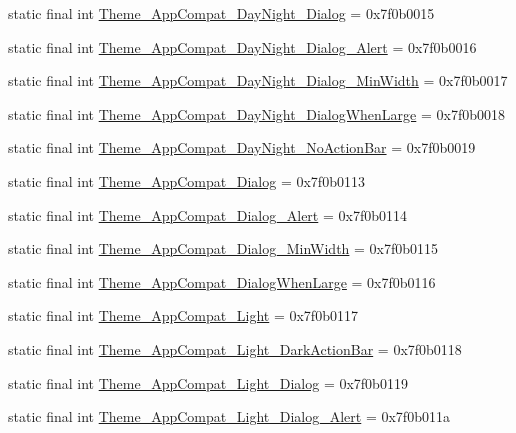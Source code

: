 \begin{CompactItemize}
static final int \hyperlink{classcom_1_1companyname_1_1x__2doo_1_1_r_1_1style_713eed972349f6073076f684ba449955}{Theme\_\-AppCompat\_\-DayNight\_\-Dialog} = 0x7f0b0015
\item 
static final int \hyperlink{classcom_1_1companyname_1_1x__2doo_1_1_r_1_1style_6a76905add50472c8b14fde676a2ddd1}{Theme\_\-AppCompat\_\-DayNight\_\-Dialog\_\-Alert} = 0x7f0b0016
\item 
static final int \hyperlink{classcom_1_1companyname_1_1x__2doo_1_1_r_1_1style_49f8b937351ad1ebd887897ba23925e2}{Theme\_\-AppCompat\_\-DayNight\_\-Dialog\_\-MinWidth} = 0x7f0b0017
\item 
static final int \hyperlink{classcom_1_1companyname_1_1x__2doo_1_1_r_1_1style_2ef2a9a17a92ed19a571f4043ea2cb1f}{Theme\_\-AppCompat\_\-DayNight\_\-DialogWhenLarge} = 0x7f0b0018
\item 
static final int \hyperlink{classcom_1_1companyname_1_1x__2doo_1_1_r_1_1style_fbc709ea0a8e7d2c503ebb0b172bdb99}{Theme\_\-AppCompat\_\-DayNight\_\-NoActionBar} = 0x7f0b0019
\item 
static final int \hyperlink{classcom_1_1companyname_1_1x__2doo_1_1_r_1_1style_b678ad2423f5cd6466680c20fbdc72a0}{Theme\_\-AppCompat\_\-Dialog} = 0x7f0b0113
\item 
static final int \hyperlink{classcom_1_1companyname_1_1x__2doo_1_1_r_1_1style_df6bcf231d495d04af324511c8821490}{Theme\_\-AppCompat\_\-Dialog\_\-Alert} = 0x7f0b0114
\item 
static final int \hyperlink{classcom_1_1companyname_1_1x__2doo_1_1_r_1_1style_d89bac951bff638eda0cb28b2048564d}{Theme\_\-AppCompat\_\-Dialog\_\-MinWidth} = 0x7f0b0115
\item 
static final int \hyperlink{classcom_1_1companyname_1_1x__2doo_1_1_r_1_1style_c29234be4832fe6db6704f428a433872}{Theme\_\-AppCompat\_\-DialogWhenLarge} = 0x7f0b0116
\item 
static final int \hyperlink{classcom_1_1companyname_1_1x__2doo_1_1_r_1_1style_8477ed56f5faec541f2c43aab373939b}{Theme\_\-AppCompat\_\-Light} = 0x7f0b0117
\item 
static final int \hyperlink{classcom_1_1companyname_1_1x__2doo_1_1_r_1_1style_5a882df799ab9158db24d00a1d0f6c80}{Theme\_\-AppCompat\_\-Light\_\-DarkActionBar} = 0x7f0b0118
\item 
static final int \hyperlink{classcom_1_1companyname_1_1x__2doo_1_1_r_1_1style_55aace3a3d9bec19d8f1524636a09bd8}{Theme\_\-AppCompat\_\-Light\_\-Dialog} = 0x7f0b0119
\item 
static final int \hyperlink{classcom_1_1companyname_1_1x__2doo_1_1_r_1_1style_76bc4399868a4273b1d1b7df13cd1ce8}{Theme\_\-AppCompat\_\-Light\_\-Dialog\_\-Alert} = 0x7f0b011a

\end{CompactItemize}
